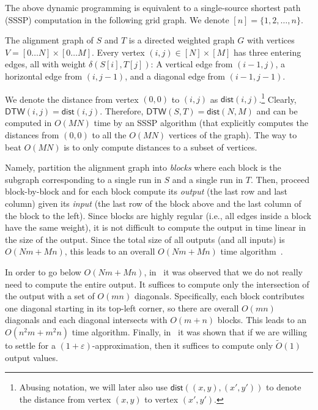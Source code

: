 \documentclass[a4paper,UKenglish,cleveref, autoref, thm-restate]{lipics-v2021}
\newcommand{\DTW}{\mathsf{DTW}}
\newcommand{\dist}{\mathsf{dist}}
\begin{document}
The above dynamic programming is equivalent to a single-source shortest path (SSSP) computation in the following grid graph. We denote $[n] = \{1,2,\ldots,n\}$.
\begin{definition}
The alignment graph of $S$ and $T$ is a directed weighted graph $G$ with vertices $V = [0\ldots N] \times [0\ldots M]$.
Every vertex $(i,j)\in [N]\times[M]$ 
has three entering edges, all with weight $\delta(S[i],T[j])$: A vertical edge from  $(i-1,j)$, a horizontal edge from  $(i,j-1)$, and a diagonal edge from $(i-1,j-1)$. 
\end{definition}

We denote the distance from vertex $(0,0)$ to $(i,j)$ as $\dist(i,j)$.\footnote{Abusing notation, we will later also use $\dist((x,y), (x',y'))$ to denote the distance from vertex $(x,y)$ to vertex $(x',y')$.} 
 Clearly, $\DTW(i,j) = \dist(i,j) $. Therefore, $\DTW(S,T)= \dist(N,M)$ and can be computed in $O(MN)$ time by an SSSP algorithm (that explicitly computes the distances from $(0,0)$ to all the $O(MN)$ vertices of the graph). The way to beat $O(MN)$ is to only compute distances to a subset of vertices. 

Namely, partition the alignment graph into {\em blocks} where each block is the subgraph corresponding to a single run in $S$ and a single run in $T$. Then, proceed block-by-block and for each block compute its {\em output} (the last row and last column) given its {\em input} (the last row of the block above and the last column of the block to the left). Since blocks are highly regular (i.e., all edges inside a block have the same weight), it is not difficult to compute the output in time linear in the size of the output. Since the total size of all outputs (and all inputs) is $O(Nm+Mn)$, this leads to an overall   $O(Nm+Mn)$ time algorithm~\cite{rle1,DBLP:journals/corr/abs-1903-03003,DBLP:conf/icalp/Kuszmaul19}. 
 
 In order to go below $O(Nm+Mn)$, in~\cite{DBLP:journals/corr/abs-1903-03003} it was observed that we do not really need to compute the entire output. It suffices to compute only the intersection of the output with a set of $O(mn)$ diagonals. Specifically, each block contributes one diagonal starting in its top-left corner, so there are overall $O(mn)$ diagonals and each diagonal intersects with $O(m+n)$ blocks. This leads to an $O(n^2m +m^2n)$ time algorithm. 
Finally, in~\cite{DBLP:conf/esa/XiK22} it was shown that if we are willing to settle for a $(1+\varepsilon)$-approximation, then it suffices to compute only $\tilde O(1)$ output values. 
\end{document}
